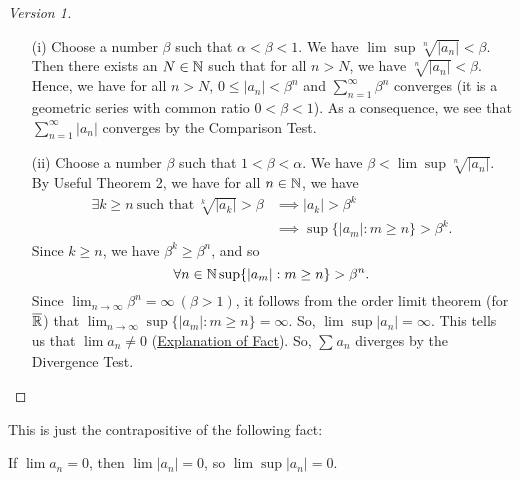 \documentclass[a4paper]{article}
\begin{document}
\begin{proof}[Version 1]
   \begin{enumerate}
       \item[(i)] Choose a number \( \beta \) such that \( \alpha < \beta < 1  \). We have \( \lim \sup \sqrt[n]{| {a}_{n} | } < \beta \). Then there exists an \( N \in \mathbb{N}  \) such that for all \( n > N  \), we have \( \sqrt[n]{| {a}_{n} | }  < \beta  \). Hence, we have for all \( n > N  \), \( 0 \leq | {a}_{n} |  < \beta^{n}  \) and \( \sum_{ n=1  }^{ \infty  } \beta^{n}    \) converges (it is a geometric series with common ratio \( 0 < \beta < 1  \)). As a consequence, we see that \( \sum_{ n=1  }^{ \infty  } | {a}_{n} |  \) converges by the Comparison Test.
       \item[(ii)] Choose a number \( \beta \) such that \( 1 < \beta < \alpha \). We have \( \beta < \lim \sup \sqrt[n]{ | {a}_{n} |  }  \). By Useful Theorem 2, we have for all \( n \in \mathbb{N}  \), we have 
           \begin{align*}
               \exists k \geq n \ \text{such that} \ \sqrt[k]{| {a}_{k} | } > \beta &\implies | {a}_{k} |  > \beta^{k} \\
                                                                                    &\implies \sup \{ | {a}_{m} |  : m \geq n  \}  > \beta^{k}.
           \end{align*}
           Since \( k \geq n  \), we have \( \beta^{k} \geq \beta^{n} \), and so
           \[  \forall n \in \mathbb{N} \sup \{ | {a}_{m} | : m \geq n  \} > \beta^{n}. \]
           Since \( \lim_{ n \to \infty  }  \beta^{n} = \infty  \ (\beta > 1) \), it follows from the order limit theorem (for \( \overline{\mathbb{R}} \)) that \( \lim_{ n \to \infty  }  \sup \{ | {a}_{m} | : m \geq n  \}  = \infty   \). So, \( \lim \sup  | {a}_{n} |  = \infty \). This tells us that \( \lim {a}_{n} \neq 0 \) ({\hyperref[Explanation of Fact]{Explanation of Fact}}). So, \( \sum_{  }^{  } {a}_{n} \) diverges by the Divergence Test.
   \end{enumerate} 
\end{proof}

\begin{remark}\label{Explanation of Fact}
    This is just the contrapositive of the following fact: 
    \begin{center}
        If \( \lim {a}_{n} = 0 \), then \( \lim | {a}_{n} |  = 0  \), so \( \lim \sup  | {a}_{n} |  = 0 \).
    \end{center}
\end{remark}
\end{document}
